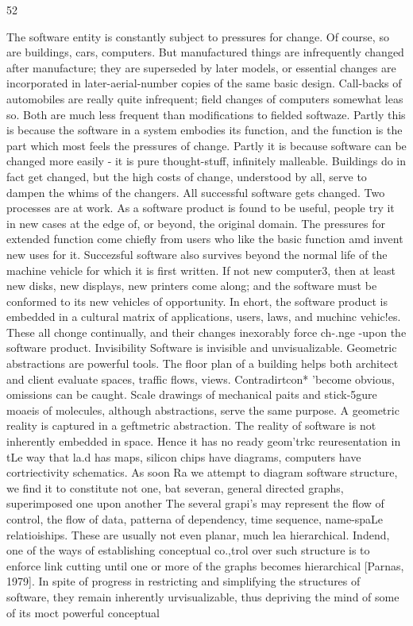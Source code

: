 \documentclass[12pt]{article}
\begin{document}
52

The software entity is constantly subject to pressures for change. Of course, so
are buildings, cars, computers. But manufactured things are infrequently changed after
manufacture; they are superseded by later models, or essential changes are incorporated
in later-aerial-number copies of the same basic design. Call-backs of automobiles are really
quite infrequent; field changes of computers somewhat leas so. Both are much less frequent
than modifications to fielded softwaze.
Partly this is because the software in a system embodies its function, and the function
is the part which most feels the pressures of change. Partly it is because software can be
changed more easily - it is pure thought-stuff, infinitely malleable. Buildings do in fact
get changed, but the high costs of change, understood by all, serve to dampen the whims
of the changers.
All successful software gets changed. Two processes are at work. As a software product
is found to be useful, people try it in new cases at the edge of, or beyond, the original
domain. The pressures for extended function come chiefly from users who like the basic
function amd invent new uses for it.
Succezsful software also survives beyond the normal life of the machine vehicle for
which it is first written. If not new computer3, then at least new disks, new displays, new
printers come along; and the software must be conformed to its new vehicles of opportunity.
In ehort, the software product is embedded in a cultural matrix of applications, users,
laws, and muchinc vehic!es. These all chonge continually, and their changes inexorably
force ch-.nge -upon the software product.
Invisibility
Software is invisible and unvisualizable. Geometric abstractions are powerful tools.
The floor plan of a building helps both architect and client evaluate spaces, traffic flows,
views. Contradirtcon* 'become obvious, omissions can be caught. Scale drawings of
mechanical paits and stick-5gure moaeis of molecules, although abstractions, serve the
same purpose. A geometric reality is captured in a geftmetric abstraction.
The reality of software is not inherently embedded in space. Hence it has no ready
geom'trkc reuresentation in tLe way that la.d has maps, silicon chips have diagrams, computers have cortriectivity schematics. As soon Ra we attempt to diagram software structure,
we find it to constitute not one, bat severan, general directed graphs, superimposed one
upon another The several grapi's may represent the flow of control, the flow of data,
patterna of dependency, time sequence, name-spaLe relatioiships. These are usually not
even planar, much lea hierarchical. Indend, one of the ways of establishing conceptual
co.,trol over such structure is to enforce link cutting until one or more of the graphs
becomes hierarchical [Parnas, 1979].
In spite of progress in restricting and simplifying the structures of software, they remain
inherently urvisualizable, thus depriving the mind of some of its moct powerful conceptual
\end{document}
